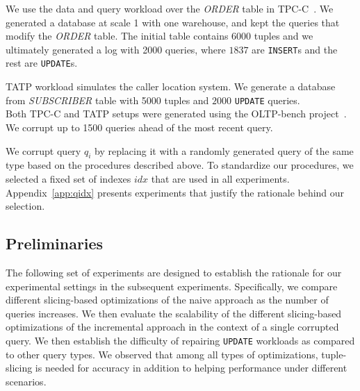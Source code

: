  We use the data and query workload over the {\it ORDER} table in TPC-C~\cite{tpcc}.  
We generated a database at scale 1 with one warehouse, and kept the queries that modify the
{\it ORDER} table. The initial table contains 6000 tuples and we ultimately generated a log with
2000 queries, where $1837$ are \texttt{INSERT}s and the rest are \texttt{UPDATE}s. 

 TATP workload simulates the 
caller location system. We generate a database from {\it SUBSCRIBER} table
with 5000 tuples and $2000$ \texttt{UPDATE} queries.\\
Both TPC-C and TATP setups were generated using the OLTP-bench project~\cite{difallah2013oltp}. 
We corrupt up to 1500 queries ahead of the most recent query.  



 We corrupt query $q_i$ by replacing it with a randomly
generated query of the same type based on the procedures described above.
To standardize our procedures, we selected a fixed set of indexes $idx$
that are used in all experiments.  
Appendix~\ref{app:qidx} presents
experiments that justify the rationale behind our selection.










\subsection{Preliminaries}
The following set of experiments are designed to establish the rationale for 
our experimental settings in the subsequent experiments.  
Specifically, we compare different slicing-based optimizations of the naive approach
as the number of queries increases.  
We then evaluate the scalability of the different slicing-based optimizations of the 
incremental approach in the context of a single
corrupted query. We then establish the difficulty of repairing \texttt{UPDATE} 
workloads as compared to other query types. We observed that among all types of 
optimizations, tuple-slicing is needed for accuracy in addition to helping performance
under different scenarios.


